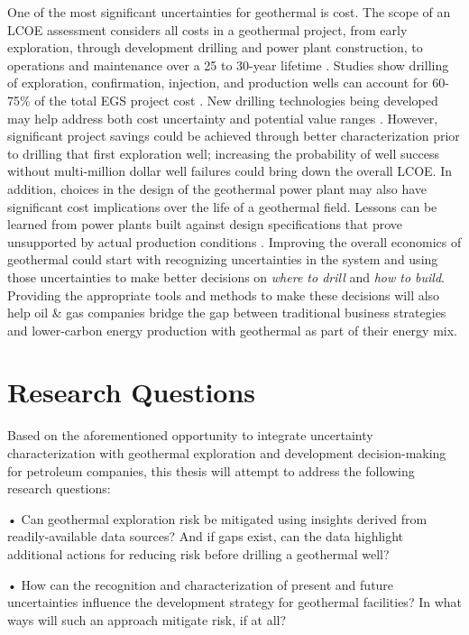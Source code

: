 One of the most significant uncertainties for geothermal is cost. The scope of an LCOE assessment considers all costs in a geothermal project, from early exploration, through development drilling and power plant construction, to operations and maintenance over a 25 to 30-year lifetime \citep{beckers_introducing_2013, entingh_volume_2006, tester_economic_1990}. Studies show drilling of exploration, confirmation, injection, and production wells can account for 60-75\% of the total EGS project cost \citep{lukawski_uncertainty_2016, petty_synergies_2009}. New drilling technologies being developed may help address both cost uncertainty and potential value ranges \citep{nrel_2020_2020}. However, significant project savings could be achieved through better characterization prior to drilling that first exploration well; increasing the probability of well success without multi-million dollar well failures could bring down the overall LCOE. In addition, choices in the design of the geothermal power plant may also have significant cost implications over the life of a geothermal field. Lessons can be learned from power plants built against design specifications that prove unsupported by actual production conditions \citep{manente_hybrid_2011}. Improving the overall economics of geothermal could start with recognizing uncertainties in the system and using those uncertainties to make better decisions on \textit{where to drill} and \textit{how to build}. Providing the appropriate tools and methods to make these decisions will also help oil \& gas companies bridge the gap between traditional business strategies and lower-carbon energy production with geothermal as part of their energy mix.
\section{Research Questions}\label{ch1:researchqs}
Based on the aforementioned opportunity to integrate uncertainty characterization with geothermal exploration and development decision-making for petroleum companies, this thesis will attempt to address the following research questions:

•	Can geothermal exploration risk be mitigated using insights derived from readily-available data sources? And if gaps exist, can the data highlight additional actions for reducing risk before drilling a geothermal well? 

•	How can the recognition and characterization of present and future uncertainties influence the development strategy for geothermal facilities? In what ways will such an approach mitigate risk, if at all?
